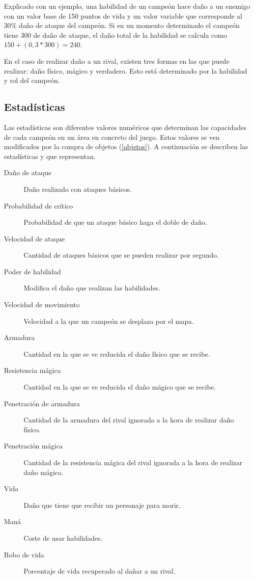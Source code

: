 Explicado con un ejemplo, una habilidad de un campeón hace daño a un enemigo con un valor base de 150 puntos de vida y un valor variable que corresponde al 30\% daño de ataque del campeón. Si en un momento determinado el campeón tiene 300 de daño de ataque, el daño total de la habilidad se calcula como $150 + (0,3 * 300) = 240$.

En el caso de realizar daño a un rival, existen tres formas en las que puede realizar: daño físico, mágico y verdadero. Esto está determinado por la habilidad y rol del campeón.

\subsection{Estadísticas}
\label{estadisticas}
Las estadísticas son diferentes valores numéricos que determinan las capacidades de cada campeón en un área en concreto del juego. Estos valores se ven modificados por la compra de objetos (\ref{objetos}). A continuación se describen las estadísticas y que representan.
\begin{description}
	\item[Daño de ataque] Daño realizado con ataques básicos.
	\item[Probabilidad de crítico] Probabilidad de que un ataque básico haga el doble de daño.
	\item[Velocidad de ataque] Cantidad de ataques básicos que se pueden realizar por segundo.
	\item[Poder de habilidad] Modifica el daño que realizan las habilidades.
	\item[Velocidad de movimiento] Velocidad a la que un campeón se desplaza por el mapa.
	\item[Armadura] Cantidad en la que se ve reducida el daño físico que se recibe.
	\item[Resistencia mágica] Cantidad en la que se ve reducida el daño mágico que se recibe.
	\item[Penetración de armadura] Cantidad de la armadura del rival ignorada a la hora de realizar daño físico.
	\item[Penetración mágica] Cantidad de la resistencia mágica del rival ignorada a la hora de realizar daño mágico.
	\item[Vida] Daño que tiene que recibir un personaje para morir.
	\item[Maná] Coste de usar habilidades.
	\item[Robo de vida] Porcentaje de vida recuperado al dañar a un rival.
\end{description}

